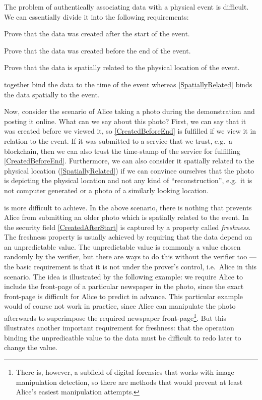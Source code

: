 The problem of authentically associating data with a physical event is 
difficult.
We can essentially divide it into the following requirements:
\begin{requirements}[A]
  \item\label{CreatedAfterStart} Prove that the data was created after the 
    start of the event.
  \item\label{CreatedBeforeEnd} Prove that the data was created before the end 
    of the event.
  \item\label{SpatiallyRelated} Prove that the data is spatially related to the 
    physical location of the event.
\end{requirements}
 together bind the data to the time of 
the event whereas \cref{SpatiallyRelated} binds the data spatially to the 
event.

Now, consider the scenario of Alice taking a photo during the demonstration and 
posting it online.
What can we say about this photo?
First, we can say that it was created before we viewed it, so 
\cref{CreatedBeforeEnd} is fulfilled if we view it in relation to the event.
If it was submitted to a service that we trust, e.g.\ a blockchain, then we can 
also trust the time-stamp of the service for fulfilling 
\cref{CreatedBeforeEnd}.
Furthermore, we can also consider it spatially related to the physical location
(\cref{SpatiallyRelated}) if we can convince ourselves that the photo is 
depicting the physical location and not any kind of \enquote{reconstruction}, 
e.g.\ it is not computer generated or a photo of a similarly looking location.

 is more difficult to achieve.
In the above scenario, there is nothing that prevents Alice from submitting an 
older photo which is spatially related to the event.
In the security field \cref{CreatedAfterStart} is captured by a property called 
\emph{freshness}.
The freshness property is usually achieved by requiring that the data depend on
an unpredictable value.
The unpredictable value is commonly a value chosen randomly by the verifier, 
but there are ways to do this without the verifier too --- the basic 
requirement is that it is not under the prover's control, i.e.\ Alice in this 
scenario.
The idea is illustrated by the following example: we require Alice to include 
the front-page of a particular newspaper in the photo, since the exact 
front-page is difficult for Alice to predict in advance.
This particular example would of course not work in practice, since Alice can 
manipulate the photo afterwards to superimpose the required newspaper 
front-page\footnote{%
  There is, however, a subfield of digital forensics that works with image 
  manipulation detection, so there are methods that would prevent at least 
  Alice's easiest manipulation attempts.
}.
But this illustrates another important requirement for freshness: that the 
operation binding the unpredicatble value to the data must be difficult to redo 
later to change the value.
